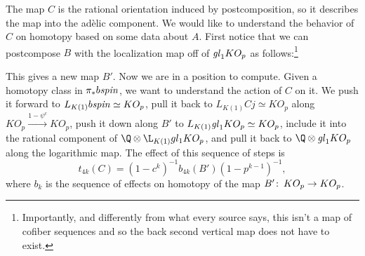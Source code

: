 The map $C$ is the rational orientation induced by postcomposition, so it describes the map into the ad\`elic component.  We would like to understand the behavior of $C$ on homotopy based on some data about $A$.  First notice that we can postcompose $B$ with the localization map off of $\mathit{gl}_1 KO_p$ as follows:\footnote{Importantly, and differently from what every source says, this isn't a map of cofiber sequences and so the back second vertical map does not have to exist.}
\begin{center}
\end{center}
This gives a new map $B'$.  Now we are in a position to compute.  Given a homotopy class in $\pi_* b\mathit{spin}$, we want to understand the action of $C$ on it.  We push it forward to $L_{K(1)} b\mathit{spin} \simeq KO_p$, pull it back to $L_{K(1)} Cj \simeq KO_p$ along $KO_p \xrightarrow{1 - \psi^c} KO_p$, push it down along $B'$ to $L_{K(1)} \mathit{gl}_1 KO_p \simeq KO_p$, include it into the rational component of $\Q \otimes \L_{K(1)} gl_1 KO_p$, and pull it back to $\Q \otimes \gl_1 KO_p$ along the logarithmic map.  The effect of this sequence of steps is \[t_{4k}(C) = (1 - c^k)^{-1} b_{4k}(B') (1 - p^{k-1})^{-1},\] where $b_k$ is the sequence of effects on homotopy of the map $B'\colon\thinspace KO_p \to KO_p$.

